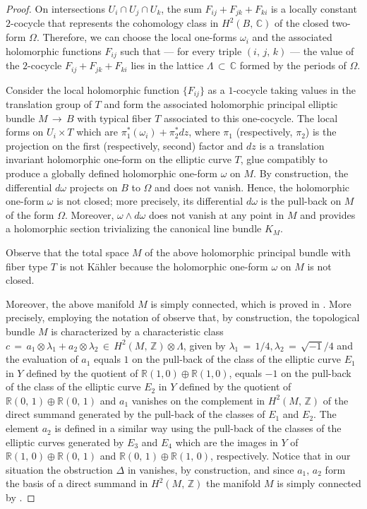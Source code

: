 \documentclass[12pt,reqno]{amsart}
\theoremstyle{definition}
\numberwithin{equation}{section}
\begin{document}
\begin{proof}
On intersections $U_i \cap U_j \cap U_k$, the sum $F_{ij} +F_{jk}+F_{ki}$ is a locally constant $2$-cocycle 
that represents the cohomology class in $H^2(B,\, { \mathbb C})$ of the closed two-form $\Omega$. 
Therefore, we can choose the local one-forms $\omega_{i}$ and the associated holomorphic functions $F_{ij}$ 
such that --- for every triple $(i,\, j,\, k)$ --- the value of the $2$-cocycle $F_{ij}+F_{jk}+F_{ki}$ 
lies in the lattice $\Lambda \,\subset\, \mathbb C$ formed by the periods of $\Omega$.

Consider the local holomorphic function $\{F_{ij}\}$ as a $1$-cocycle taking values in the translation 
group of $T$ and form the associated holomorphic principal elliptic bundle $M \, \longrightarrow\, B$ with 
typical fiber $T$ associated to this one-cocycle. The local forms on $U_i \times T$ which are 
$\pi_1^*(\omega_i )+\pi_2^*dz $, where $\pi_1$ (respectively, $\pi_2$) is the projection on the first 
(respectively, second) factor and $d z$ is a translation invariant holomorphic one-form on the elliptic 
curve $T$, glue compatibly to produce a globally defined holomorphic one-form $\omega$ on $M$. By 
construction, the differential $d\omega$ projects on $B$ to $\Omega$ and does not vanish. Hence, the 
holomorphic one-form $\omega$ is not closed; more precisely, its differential $d \omega$ is the pull-back 
on $M$ of the form $\Omega$. Moreover, $\omega \wedge d \omega$ does not vanish at any point in $M$ and 
provides a holomorphic section trivializing the canonical line bundle $K_M$.

Observe that the total space $M$ of the above holomorphic principal bundle
with fiber type $T$ is not K\"ahler because the holomorphic one-form $\omega$ on $M$ is not closed.

Moreover, the above manifold $M$ is simply connected, which is proved in \cite[Theorem 12.3 and Remark 
12.4]{Ho}. More precisely, employing the notation of \cite{Ho} observe that, by construction, the 
topological bundle $M$ is characterized by a characteristic class $c\,=\, a_1 \otimes \lambda_1 + a_2 
\otimes \lambda_2 \,\in\, H^2(M,\, \mathbb Z) \otimes \Lambda$, given by $\lambda_1\,=\,1/4, \lambda_2\,=\, 
\sqrt{-1}/4$ and the evaluation of $a_1$ equals $1$ on the pull-back of the class of the elliptic curve 
$E_1$ in $Y$ defined by the quotient of $\mathbb R (1,0)\oplus \mathbb R (1,0)$, equals $-1$ on the 
pull-back of the class of the elliptic curve $E_2$ in $Y$ defined by the quotient of $\mathbb R 
(0,\,1)\oplus \mathbb R (0,\,1)$ and $a_1$ vanishes on the complement in $H^2(M,\, \mathbb Z)$ of the 
direct summand generated by the pull-back of the classes of $E_1$ and $E_2$. The element $a_2$ is defined 
in a similar way using the pull-back of the classes of the elliptic curves generated by $E_3$ and $E_4$ 
which are the images in $Y$ of $\mathbb R (1,\,0)\oplus \mathbb R (0,\,1)$ and $\mathbb R (0,\,1)\oplus 
\mathbb R (1,\,0)$, respectively. Notice that in our situation the obstruction $\Delta$ in 
\cite[Proposition 6.6 and Remark 12.4]{Ho} vanishes, by construction, and since $a_1,\, a_2$ form the basis 
of a direct summand in $H^2(M,\, \mathbb Z)$ the manifold $M$ is simply connected by \cite[Theorem 
12.3]{Ho}.
\end{proof}
\end{document}
